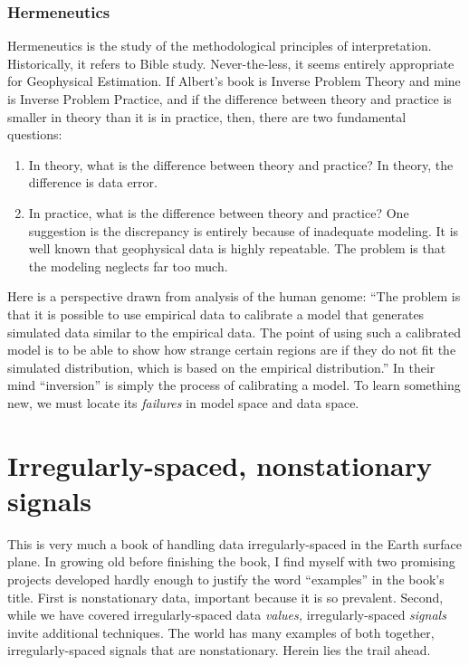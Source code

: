 \subsection{Hermeneutics}
\par
Hermeneutics is the
study of the methodological principles of interpretation.
Historically, it refers to Bible study.
Never-the-less, it seems entirely appropriate for Geophysical Estimation.
If Albert's book is Inverse Problem Theory and mine is
Inverse Problem Practice,
and if the difference between theory and practice is smaller in theory
than it is in practice, then,
there are two fundamental questions:
\begin{enumerate}
\item In theory, what is the difference between theory and practice?
	In theory, the difference is data error.
\item In practice, what is the difference between theory and practice?
	One suggestion is the discrepancy is entirely because of inadequate modeling.
	It is well known that geophysical data is highly repeatable.
	The problem is that the modeling neglects far too much.
\end{enumerate}

\par
Here is a perspective drawn from analysis of the human genome:
``The problem is that
it is possible to use empirical data to calibrate a model
that generates simulated data similar to the empirical data.
The point of using such a calibrated model
is to be able to show how strange certain regions are
if they do not fit the simulated distribution,
which is based on the empirical distribution.''
In their mind
``inversion'' is simply the process of calibrating a model.
To learn something new,
we must locate its {\it failures}
in model space and data space.

\chapter{Irregularly-spaced, nonstationary signals}    \label{paper:ftw}

\par
This is very much a book of handling data irregularly-spaced in the Earth surface plane.
In growing old before finishing the book,
I find myself with two promising projects developed
hardly enough to justify the word ``examples'' in the book's title.
First is nonstationary data,
important because it is so prevalent.
Second, while we have covered irregularly-spaced data
{\em values,}
irregularly-spaced
{\em signals}
invite additional techniques.
The world has many examples of both together,
irregularly-spaced signals that are nonstationary.
Herein lies the trail ahead.



